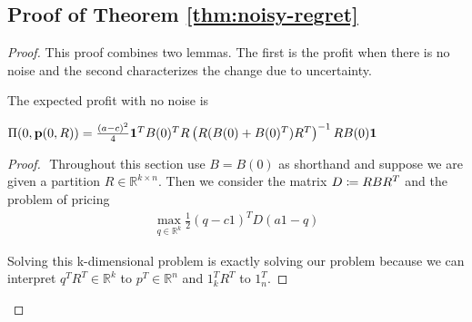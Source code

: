 \subsection{Proof of Theorem \ref{thm:noisy-regret}}
\begin{proof}

    This proof combines two lemmas. The first is the profit when there is no noise and the second characterizes the change due to uncertainty. 
    \begin{lemma} 
        The expected profit with no noise is

        $\Pi(0, \mathbf{p}(0,R)) = \frac{(a-c)^2}{4} \mathbf{1}^T B(0)^T R \left( R (B(0) + B(0)^T ) R^T\right)^{-1} R B(0) \mathbf{1} $
    \end{lemma}
    \begin{proof}
             $ $\newline
            Throughout this section use $B = B(0)$ as shorthand and suppose we are given a partition $ R \in \mathbb{R}^{k \times n}$. Then we consider the  matrix $D \coloneqq  R B R^T$ and the problem of pricing 
            \begin{align*}
                \max_{q \in \mathbb{R}^k} \frac{1}{2} (q - c1)^T D (a1 - q)
            \end{align*}
        
            Solving this k-dimensional problem is exactly solving our problem because we can interpret $q^T R^T \in \mathbb{R}^{k}$ to $p^T \in \mathbb{R}^{n}$ and $1_k^T R^T $ to $1_n^T $. 
        

\end{proof}
\end{proof}
